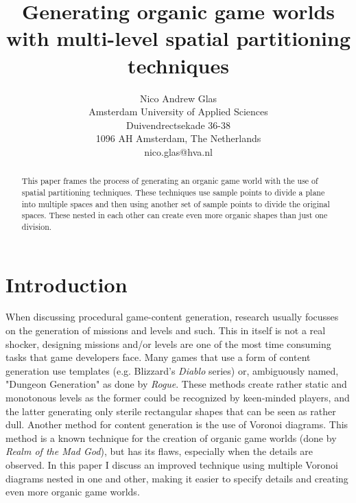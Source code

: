 \documentclass[11pt,a4paper,twocolumn]{article}
\title{\textbf{Generating organic game worlds with multi-level spatial partitioning techniques}}
\author{ \small Nico Andrew Glas \\ \small Amsterdam University of Applied Sciences \\ \small Duivendrectsekade 36-38 \\ \small 1096 AH Amsterdam, The Netherlands \\ \small nico.glas@hva.nl}
\begin{document}
\maketitle  

\begin{abstract}
This paper frames the process of generating an organic game world with the use of spatial partitioning techniques. These techniques use sample points to divide a plane into multiple spaces and then using another set of sample points to divide the original spaces. These nested in each other can create even more organic shapes than just one division.
\end{abstract}

\section{Introduction}
When discussing procedural game-content generation, research usually focusses on the generation of missions and levels and such. This in itself is not a real shocker, designing missions and/or levels are one of the most time consuming tasks that game developers face. Many games that use a form of content generation use templates (e.g. Blizzard's \emph{Diablo} series) or, ambiguously named, "Dungeon Generation" as done by \emph{Rogue}. These methods create rather static and monotonous levels as the former could be recognized by keen-minded players, and the latter generating only sterile rectangular shapes that can be seen as rather dull. Another method for content generation is the use of Voronoi diagrams. This method is a known technique\cite{patel} for the creation of organic game worlds (done by \emph{Realm of the Mad God}), but has its flaws, especially when the details are observed. In this paper I discuss an improved technique using multiple Voronoi diagrams nested in one and other, making it easier to specify details and creating even more organic game worlds.
\end{document}
